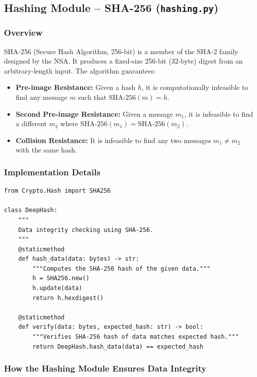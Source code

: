 \documentclass[12pt,a4paper]{article}
\begin{document}
\subsection{Hashing Module – SHA-256 (\texttt{hashing.py})}

\subsubsection{Overview}
SHA-256 (Secure Hash Algorithm, 256-bit) is a member of the SHA-2 family designed by the NSA. It produces a fixed-size 256-bit (32-byte) digest from an arbitrary-length input. The algorithm guarantees:
\begin{itemize}
    \item \textbf{Pre-image Resistance:} Given a hash $h$, it is computationally infeasible to find any message $m$ such that $\text{SHA-256}(m) = h$.
    \item \textbf{Second Pre-image Resistance:} Given a message $m_1$, it is infeasible to find a different $m_2$ where $\text{SHA-256}(m_1) = \text{SHA-256}(m_2)$.
    \item \textbf{Collision Resistance:} It is infeasible to find any two messages $m_1 \neq m_2$ with the same hash.
\end{itemize}

\subsubsection{Implementation Details}

\begin{lstlisting}[caption={SHA-256 Hashing Module – \texttt{hashing.py}}]
from Crypto.Hash import SHA256

class DeepHash:
    """
    Data integrity checking using SHA-256.
    """
    @staticmethod
    def hash_data(data: bytes) -> str:
        """Computes the SHA-256 hash of the given data."""
        h = SHA256.new()
        h.update(data)
        return h.hexdigest()

    @staticmethod
    def verify(data: bytes, expected_hash: str) -> bool:
        """Verifies SHA-256 hash of data matches expected hash."""
        return DeepHash.hash_data(data) == expected_hash
\end{lstlisting}

\subsubsection{How the Hashing Module Ensures Data Integrity}
\end{document}
